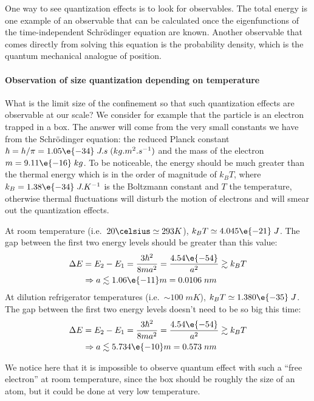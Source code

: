 One way to see quantization effects is to look for observables. The total energy is one example of an observable that can be calculated once the eigenfunctions of the time-independent Schr\"odinger equation are known. Another observable that comes directly from solving this equation is the probability density, which is the quantum mechanical analogue of position.


\paragraph{Observation of size quantization depending on temperature}
What is the limit size of the confinement so that such quantization effects are observable at our scale? We consider for example that the particle is an electron trapped in a box.
The answer will come from the very small constants we have from the Schr\"odinger equation: the reduced Planck constant $\hbar = h /  \pi = 1.05 \e{-34} \; J.s \; ( kg.m^2.s^{-1} )$ and the mass of the electron $m=9.11  \e{-16} \; kg $. To be noticeable, the energy should be much greater than the thermal energy which is in the order of magnitude of $k_B T$, where $k_B=1.38 \e{-34} \; J . K^{-1} $ is the Boltzmann constant and $T$ the temperature, otherwise thermal fluctuations will disturb the motion of electrons and will smear out the quantization effects.

At room temperature (i.e.\ $20 \celsius \simeq 293 K$), $k_B T \simeq 4.045 \e{-21} \; J$. The gap between the first two energy levels should be greater than this value:
\begin{align}
\Delta E &= E_2 -E_1 = \frac{3 \hbar^2}{8 m a^2}= \frac{4.54 \e{-54}}{a^2} \gtrsim k_B T \\ \nonumber
&\Rightarrow a \lesssim 1.06 \e{-11} m = 0.0106 \; nm
\end{align}
At dilution refrigerator temperatures (i.e.\ $\sim 100 \; mK$), $k_B T \simeq 1.380 \e{-35} \; J$. The gap between the first two energy levels doesn't need to be so big this time:
\begin{align}
\Delta E &= E_2 -E_1 = \frac{3 \hbar^2}{8 m a^2}= \frac{4.54 \e{-54}}{a^2} \gtrsim k_B T \\ \nonumber
&\Rightarrow a \lesssim 5.734 \e{-10} m = 0.573 \; nm
\end{align}

We notice here that it is impossible to observe quantum effect with such a ``free electron'' at room temperature, since the box should be roughly the size of an atom, but it could be done at very low temperature.

